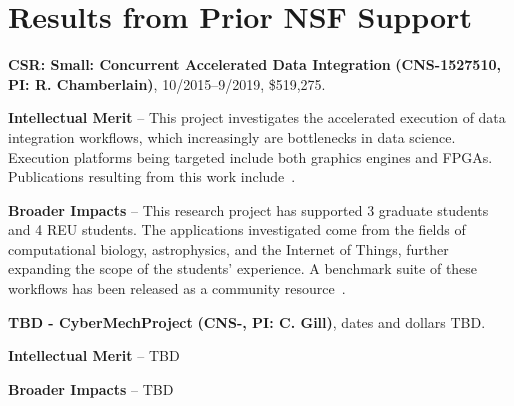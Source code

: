 \section{Results from Prior NSF Support}
\label{sec:prior}

\noindent
{\large\bf CSR: Small: Concurrent Accelerated Data Integration}
{\bf (CNS-1527510,
PI: R. Chamberlain)}, 
10/2015--9/2019, \$519,275.  

\textbf{Intellectual Merit} -- This project investigates the
accelerated execution of data integration workflows, which
increasingly are bottlenecks in data science. Execution platforms
being targeted include both graphics engines and FPGAs.  Publications
resulting from this work include~\cite{dibs,c17,mgc16,js16}.

\textbf{Broader Impacts} -- This research project has supported 3
graduate students and 4 REU students.  The applications investigated
come from the fields of computational biology, astrophysics, and the
Internet of Things, further expanding the scope of the students'
experience.  A benchmark suite of these workflows has been released
as a community resource~\cite{dibsv1}.

\noindent
{\large\bf TBD - CyberMechProject}
{\bf (CNS-,
PI: C. Gill)}, dates and dollars TBD.  

\textbf{Intellectual Merit} -- TBD

\textbf{Broader Impacts} -- TBD

